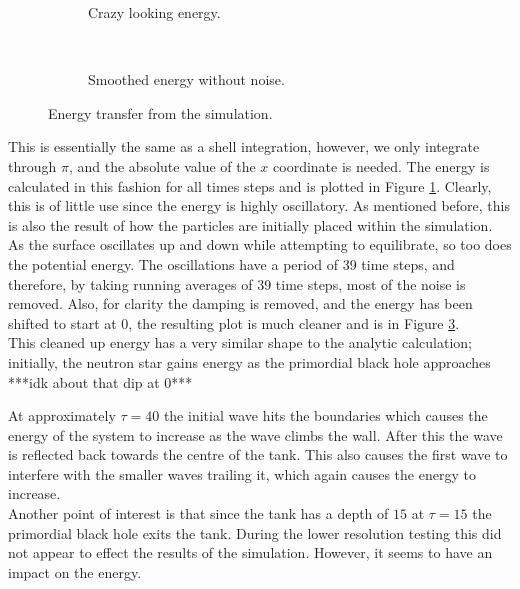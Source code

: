 \documentclass[12pt]{report}
\begin{document}
\begin{figure}
\centering
\begin{subfigure}{\textwidth}

\caption{Crazy looking energy.}
\label{fig:badenergy}
\end{subfigure} \\
\begin{subfigure}{\textwidth}

\caption{Smoothed energy without noise.}
\label{fig:goodenergy}
\end{subfigure}
\caption{Energy transfer from the simulation.}
\end{figure}

This is essentially the same as a shell integration, however, we only integrate through $\pi$, and the absolute value of the $x$ coordinate is needed. The energy is calculated in this fashion for all times steps and is plotted in Figure \ref{fig:badenergy}. Clearly, this is of little use since the energy is highly oscillatory. As mentioned before, this is also the result of how the particles are initially placed within the simulation. As the surface oscillates up and down while attempting to equilibrate, so too does the potential energy. The oscillations have a period of 39 time steps, and therefore, by taking running averages of 39 time steps, most of the noise is removed. Also, for clarity the damping is removed, and the energy has been shifted to start at 0, the resulting plot is much cleaner and is in Figure \ref{fig:goodenergy}. \\

This cleaned up energy has a very similar shape to the analytic calculation; initially, the neutron star gains energy as the primordial black hole approaches
***idk about that dip at 0***

At approximately $\tau = 40$ the initial wave hits the boundaries which causes the energy of the system to increase as the wave climbs the wall. After this the wave is reflected back towards the centre of the tank. This also causes the first wave to interfere with the smaller waves trailing it, which again causes the energy to increase. \\

Another point of interest is that since the tank has a depth of $15$ at $\tau = 15$ the primordial black hole exits the tank. During the lower resolution testing this did not appear to effect the results of the simulation. However, it seems to have an impact on the energy.
\end{document}
